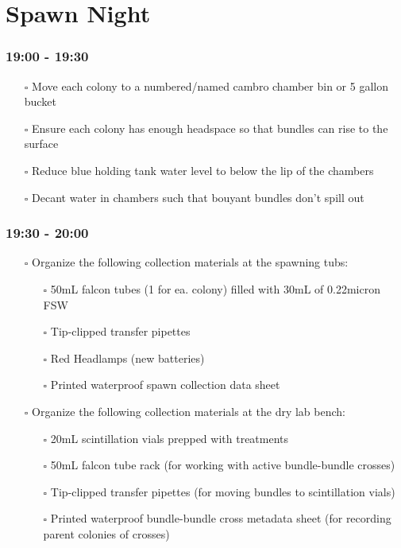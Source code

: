 \documentclass[
  letterpaper,
  DIV=11,
  numbers=noendperiod]{scrartcl}
\providecommand{\tightlist}{%
  \setlength{\itemsep}{0pt}\setlength{\parskip}{0pt}}\usepackage{longtable,booktabs,array}
\begin{document}
\hypertarget{spawn-night}{%
\section{Spawn Night}\label{spawn-night}}

\hypertarget{section}{%
\subsubsection{19:00 - 19:30}\label{section}}

\begin{itemize}
\tightlist
\item[$\square$]
  Move each colony to a numbered/named cambro chamber bin or 5 gallon
  bucket
\item[$\square$]
  Ensure each colony has enough headspace so that bundles can rise to
  the surface
\item[$\square$]
  Reduce blue holding tank water level to below the lip of the chambers
\item[$\square$]
  Decant water in chambers such that bouyant bundles don't spill out
\end{itemize}

\hypertarget{section-1}{%
\subsubsection{19:30 - 20:00}\label{section-1}}

\begin{itemize}
\item[$\square$]
  Organize the following collection materials at the spawning tubs:

  \begin{itemize}
  \tightlist
  \item[$\square$]
    50mL falcon tubes (1 for ea. colony) filled with 30mL of 0.22micron
    FSW
  \item[$\square$]
    Tip-clipped transfer pipettes
  \item[$\square$]
    Red Headlamps (new batteries)
  \item[$\square$]
    Printed waterproof spawn collection data sheet
  \end{itemize}
\item[$\square$]
  Organize the following collection materials at the dry lab bench:

  \begin{itemize}
  \item[$\square$]
    20mL scintillation vials prepped with treatments
  \item[$\square$]
    50mL falcon tube rack (for working with active bundle-bundle
    crosses)
  \item[$\square$]
    Tip-clipped transfer pipettes (for moving bundles to scintillation
    vials)
  \item[$\square$]
    Printed waterproof bundle-bundle cross metadata sheet (for recording
    parent colonies of crosses)
  \end{itemize}
\end{itemize}
\end{document}
